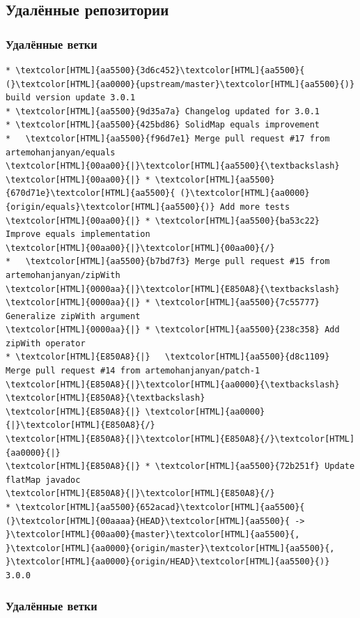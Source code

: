 \documentclass[pdf,russian]{beamer}
\begin{document}
\subsection{Удалённые репозитории}
\begin{frame}[fragile]
    \frametitle{Удалённые ветки}
    \begin{Verbatim}[commandchars=\\\{\},fontsize=\relsize{-2}]
* \textcolor[HTML]{aa5500}{3d6c452}\textcolor[HTML]{aa5500}{ (}\textcolor[HTML]{aa0000}{upstream/master}\textcolor[HTML]{aa5500}{)} build version update 3.0.1
* \textcolor[HTML]{aa5500}{9d35a7a} Changelog updated for 3.0.1
* \textcolor[HTML]{aa5500}{425bd86} SolidMap equals improvement
*   \textcolor[HTML]{aa5500}{f96d7e1} Merge pull request #17 from artemohanjanyan/equals
\textcolor[HTML]{00aa00}{|}\textcolor[HTML]{aa5500}{\textbackslash}  
\textcolor[HTML]{00aa00}{|} * \textcolor[HTML]{aa5500}{670d71e}\textcolor[HTML]{aa5500}{ (}\textcolor[HTML]{aa0000}{origin/equals}\textcolor[HTML]{aa5500}{)} Add more tests
\textcolor[HTML]{00aa00}{|} * \textcolor[HTML]{aa5500}{ba53c22} Improve equals implementation
\textcolor[HTML]{00aa00}{|}\textcolor[HTML]{00aa00}{/}  
*   \textcolor[HTML]{aa5500}{b7bd7f3} Merge pull request #15 from artemohanjanyan/zipWith
\textcolor[HTML]{0000aa}{|}\textcolor[HTML]{E850A8}{\textbackslash}  
\textcolor[HTML]{0000aa}{|} * \textcolor[HTML]{aa5500}{7c55777} Generalize zipWith argument
\textcolor[HTML]{0000aa}{|} * \textcolor[HTML]{aa5500}{238c358} Add zipWith operator
* \textcolor[HTML]{E850A8}{|}   \textcolor[HTML]{aa5500}{d8c1109} Merge pull request #14 from artemohanjanyan/patch-1
\textcolor[HTML]{E850A8}{|}\textcolor[HTML]{aa0000}{\textbackslash} \textcolor[HTML]{E850A8}{\textbackslash}  
\textcolor[HTML]{E850A8}{|} \textcolor[HTML]{aa0000}{|}\textcolor[HTML]{E850A8}{/}  
\textcolor[HTML]{E850A8}{|}\textcolor[HTML]{E850A8}{/}\textcolor[HTML]{aa0000}{|}   
\textcolor[HTML]{E850A8}{|} * \textcolor[HTML]{aa5500}{72b251f} Update flatMap javadoc
\textcolor[HTML]{E850A8}{|}\textcolor[HTML]{E850A8}{/}  
* \textcolor[HTML]{aa5500}{652acad}\textcolor[HTML]{aa5500}{ (}\textcolor[HTML]{00aaaa}{HEAD}\textcolor[HTML]{aa5500}{ -> }\textcolor[HTML]{00aa00}{master}\textcolor[HTML]{aa5500}{, }\textcolor[HTML]{aa0000}{origin/master}\textcolor[HTML]{aa5500}{, }\textcolor[HTML]{aa0000}{origin/HEAD}\textcolor[HTML]{aa5500}{)} 3.0.0
    \end{Verbatim}
\end{frame}

\begin{frame}[fragile]
    \frametitle{Удалённые ветки}
\end{frame}
\end{document}
